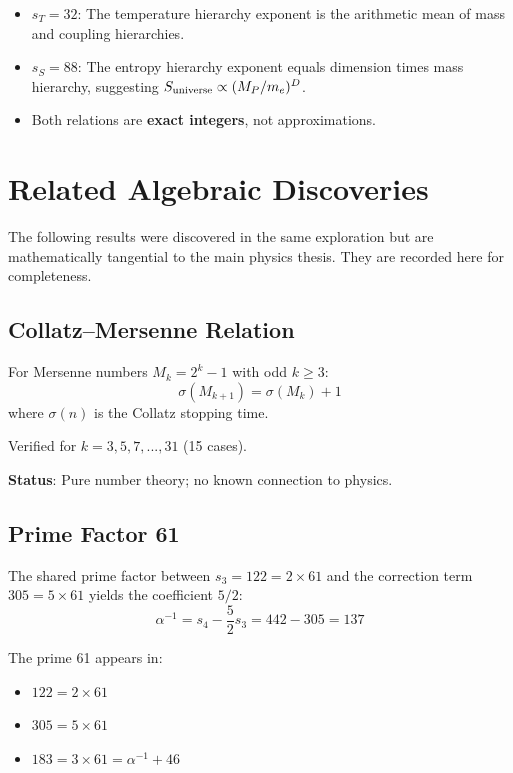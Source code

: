 \documentclass[12pt,a4paper]{article}
\begin{document}
\begin{itemize}
\item $s_T = 32$: The temperature hierarchy exponent is the arithmetic mean of 
mass and coupling hierarchies.

\item $s_S = 88$: The entropy hierarchy exponent equals dimension times mass hierarchy,
suggesting $S_{\rm universe} \propto (M_P/m_e)^D$.

\item Both relations are \textbf{exact integers}, not approximations.
\end{itemize}

\section{Related Algebraic Discoveries}

The following results were discovered in the same exploration but are 
mathematically tangential to the main physics thesis. They are recorded 
here for completeness.

\subsection{Collatz--Mersenne Relation}

For Mersenne numbers $M_k = 2^k - 1$ with odd $k \geq 3$:
\begin{equation}
\sigma(M_{k+1}) = \sigma(M_k) + 1
\end{equation}
where $\sigma(n)$ is the Collatz stopping time.

Verified for $k = 3, 5, 7, ..., 31$ (15 cases).

\textbf{Status}: Pure number theory; no known connection to physics.

\subsection{Prime Factor 61}

The shared prime factor between $s_3 = 122 = 2 \times 61$ and the 
correction term $305 = 5 \times 61$ yields the coefficient $5/2$:
\begin{equation}
\alpha^{-1} = s_4 - \frac{5}{2}s_3 = 442 - 305 = 137
\end{equation}

The prime 61 appears in:
\begin{itemize}
\item $122 = 2 \times 61$
\item $305 = 5 \times 61$ 
\item $183 = 3 \times 61 = \alpha^{-1} + 46$
\end{itemize}
\end{document}
